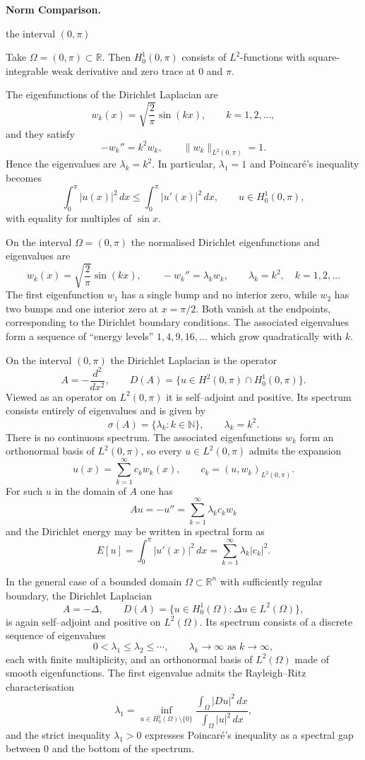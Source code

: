 \begin{problem}[CP-II-0098]
\label{prob:cp-ii-0098}
\textbf{Norm Comparison.}

\hspace*{1.5em}the interval $(0,\pi)$

Take $\Omega=(0,\pi)\subset\mathbb{R}$. Then
$H_0^1(0,\pi)$ consists of $L^2$-functions with square-integrable weak
derivative and zero trace at $0$ and $\pi$.

The eigenfunctions of the Dirichlet Laplacian are
\[
w_k(x) = \sqrt{\frac{2}{\pi}}\sin(kx),\qquad k=1,2,\dots,
\]
and they satisfy
\[
-w_k'' = k^2 w_k,\qquad \|w_k\|_{L^2(0,\pi)}=1.
\]
Hence the eigenvalues are $\lambda_k = k^2$. In particular,
$\lambda_1=1$ and Poincar\'e's inequality becomes
\[
\int_0^\pi |u(x)|^2\,dx \le \int_0^\pi |u'(x)|^2\,dx,
\qquad u\in H_0^1(0,\pi),
\]
with equality for multiples of $\sin x$.

On the interval $\Omega=(0,\pi)$ the normalised Dirichlet eigenfunctions and
eigenvalues are
\[
w_k(x) = \sqrt{\frac{2}{\pi}}\sin(kx),
\qquad -w_k'' = \lambda_k w_k,
\qquad \lambda_k = k^2,\quad k=1,2,\dots
\]
The first eigenfunction $w_1$ has a single bump and no interior zero, while
$w_2$ has two bumps and one interior zero at $x=\pi/2$. Both vanish at the
endpoints, corresponding to the Dirichlet boundary conditions. The associated
eigenvalues form a sequence of ``energy levels'' $1,4,9,16,\dots$ which grow
quadratically with $k$.

On the interval $(0,\pi)$ the Dirichlet Laplacian is the operator
\[
A = -\frac{d^2}{dx^2}, \qquad
D(A) = \{u\in H^2(0,\pi)\cap H_0^1(0,\pi)\}.
\]
Viewed as an operator on $L^2(0,\pi)$ it is self--adjoint and positive. Its
spectrum consists entirely of eigenvalues and is given by
\[
\sigma(A) = \{\lambda_k : k\in\mathbb{N}\},
\qquad \lambda_k = k^2.
\]
There is no continuous spectrum. The associated eigenfunctions $w_k$ form an
orthonormal basis of $L^2(0,\pi)$, so every $u\in L^2(0,\pi)$ admits the
expansion
\[
u(x) = \sum_{k=1}^\infty c_k w_k(x), \qquad
c_k = (u,w_k)_{L^2(0,\pi)}.
\]
For such $u$ in the domain of $A$ one has
\[
Au = -u'' = \sum_{k=1}^\infty \lambda_k c_k w_k
\]
and the Dirichlet energy may be written in spectral form as
\[
E[u] = \int_0^\pi |u'(x)|^2\,dx
= \sum_{k=1}^\infty \lambda_k |c_k|^2.
\]

In the general case of a bounded domain $\Omega\subset\mathbb{R}^n$ with
sufficiently regular boundary, the Dirichlet Laplacian
\[
A = -\Delta, \qquad
D(A) = \{u\in H_0^1(\Omega):\Delta u\in L^2(\Omega)\},
\]
is again self--adjoint and positive on $L^2(\Omega)$. Its spectrum consists of a
discrete sequence of eigenvalues
\[
0 < \lambda_1 \le \lambda_2 \le \cdots, \qquad
\lambda_k \to \infty \text{ as } k\to\infty,
\]
each with finite multiplicity, and an orthonormal basis of $L^2(\Omega)$ made
of smooth eigenfunctions. The first eigenvalue admits the Rayleigh--Ritz
characterisation
\[
\lambda_1
= \inf_{u\in H_0^1(\Omega)\setminus\{0\}}
\frac{\displaystyle\int_\Omega |Du|^2\,dx}
{\displaystyle\int_\Omega |u|^2\,dx},
\]
and the strict inequality $\lambda_1>0$ expresses Poincar\'e's inequality as a
spectral gap between $0$ and the bottom of the spectrum.
\end{problem}

